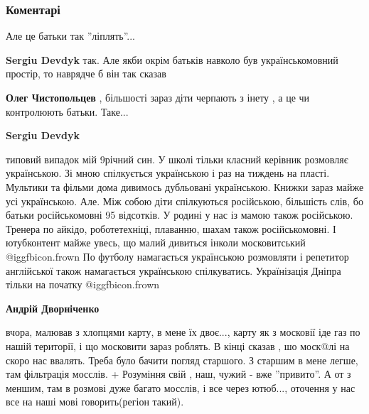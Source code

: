  
 
 
 
 
\subsubsection{Коментарі}

\begin{itemize} %
Але це батьки так ''ліплять''...

\begin{itemize} %
\textbf{Sergiu Devdyk} так. Але якби окрім батьків навколо був українськомовний простір, то наврядче б він так сказав

\textbf{Олег Чистопольцев} , більшості зараз діти черпають з інету , а це чи контролюють батьки. Таке...

\textbf{Sergiu Devdyk} 

типовий випадок мій 9річний син. У школі тільки класний керівник розмовляє українською.
Зі мною спілкується українською і раз на тиждень на пласті.
Мультики та фільми дома дивимось дубльовані українською.
Книжки зараз майже усі українською.
Але.
Між собою діти спілкуються російською, більшість слів, бо батьки російськомовні 95 відсотків.
У родині у нас із мамою також російською.
Тренера по айкідо, роботетехніці, плаванню, шахам також російськомовні.
І ютубконтент майже увесь, що малий дивиться інколи московитський  @igg{fbicon.frown} 
По футболу намагається українською розмовляти і репетитор англійської також намагається українською спілкуватись.
Українізація Дніпра тільки на початку  @igg{fbicon.frown} 

\textbf{Андрій Дворніченко} 

вчора, малював з хлопцями карту, в мене їх двоє..., карту як з московії іде газ
по нашій території, і що московити зараз роблять. В кінці сказав , шо моск@лі
на скоро нас ввалять. Треба було бачити погляд старшого. З старшим в мене
легше, там фільтрація мосслів. + Розуміння свій , наш, чужий - вже ''привито''.
А от з меншим, там в розмові дуже багато мосслів, і все через ютюб..., оточення
у нас все на наші мові говорить(регіон такий).


\end{itemize}
\end{itemize}
